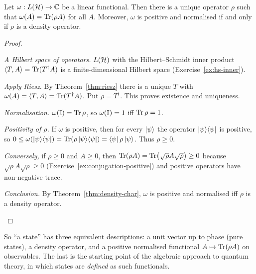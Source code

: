 \begin{theorem}\label{thm:riesz-operators}
  Let $\omega:L(\mathcal{H})\to\mathbb{C}$ be a linear functional. Then there is a unique operator $\rho$ such that $\omega(A)=\operatorname{Tr}(\rho A)$ for all $A$. Moreover, $\omega$ is positive and normalised if and only if $\rho$ is a density operator.
\end{theorem}
\begin{proof}
  \begin{steps}
    \item \emph{A Hilbert space of operators.} $L(\mathcal{H})$ with the Hilbert--Schmidt inner product $\langle T,A\rangle=\operatorname{Tr}(T^\dagger A)$ is a finite-dimensional Hilbert space (Exercise~\ref{ex:hs-inner}).
    \item \emph{Apply Riesz.} By Theorem~\ref{thm:riesz} there is a unique $T$ with $\omega(A)=\langle T,A\rangle=\operatorname{Tr}(T^\dagger A)$. Put $\rho=T^\dagger$. This proves existence and uniqueness.
    \item \emph{Normalisation.} $\omega(\mathbb{I})=\operatorname{Tr}\rho$, so $\omega(\mathbb{I})=1$ iff $\operatorname{Tr}\rho=1$.
    \item \emph{Positivity of $\rho$.} If $\omega$ is positive, then for every $\left|\psi\right\rangle$ the operator $\left|\psi\right\rangle\!\left\langle\psi\right|$ is positive, so $0\le\omega(\left|\psi\right\rangle\!\left\langle\psi\right|)=\operatorname{Tr}(\rho\left|\psi\right\rangle\!\left\langle\psi\right|)=\left\langle\psi\right|\rho\left|\psi\right\rangle$. Thus $\rho\ge0$.
    \item \emph{Conversely,} if $\rho\ge0$ and $A\ge0$, then $\operatorname{Tr}(\rho A)=\operatorname{Tr}\bigl(\sqrt\rho A\sqrt\rho\bigr)\ge0$ because $\sqrt\rho A\sqrt\rho\ge0$ (Exercise~\ref{ex:conjugation-positive}) and positive operators have non-negative trace.
    \item \emph{Conclusion.} By Theorem~\ref{thm:density-char}, $\omega$ is positive and normalised iff $\rho$ is a density operator. \qedhere
  \end{steps}
\end{proof}

So ``a state'' has three equivalent descriptions: a unit vector up to phase (pure states), a density operator, and a positive normalised functional $A\mapsto\operatorname{Tr}(\rho A)$ on observables. The last is the starting point of the algebraic approach to quantum theory, in which states are \emph{defined} as such functionals.

